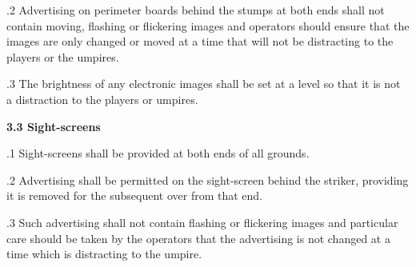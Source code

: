 \documentclass[12pt]{article}
\begin{document}
\vspace{\baselineskip}
\begin{adjustwidth}{0.5in}{0.04in}
{\fontsize{9pt}{10.8pt}.2 \tabto{0.49in} Advertising on perimeter boards behind the stumps at both ends shall not contain moving, flashing or flickering images and operators should ensure that the images are only changed or moved at a time that will not be distracting to the players or the umpires.\par}\par

\end{adjustwidth}


\vspace{\baselineskip}
\begin{adjustwidth}{0.5in}{0.11in}
{\fontsize{9pt}{10.8pt}.3 \tabto{0.49in} The brightness of any electronic images shall be set at a level so that it is not a distraction to the players or umpires.\par}\par

\end{adjustwidth}


\vspace{\baselineskip}
{\fontsize{11pt}{13.2pt}\selectfont \textbf{3.3 \tabto{0.47in} Sight-screens}\par}\par


\vspace{\baselineskip}
{\fontsize{9pt}{10.8pt}.1 \tabto{0.49in} Sight-screens shall be provided at both ends of all grounds.\par}\par


\vspace{\baselineskip}
\begin{adjustwidth}{0.5in}{0.56in}
{\fontsize{9pt}{10.8pt}.2 \tabto{0.49in} Advertising shall be permitted on the sight-screen behind the striker, providing it is removed for the subsequent over from that end.\par}\par

\end{adjustwidth}


\vspace{\baselineskip}
\begin{adjustwidth}{0.5in}{0.21in}
{\fontsize{9pt}{10.8pt}.3 \tabto{0.49in} Such advertising shall not contain flashing or flickering images and particular care should be taken by the operators that the advertising is not changed at a time which is distracting to the umpire.\par}\par

\end{adjustwidth}
\end{document}
